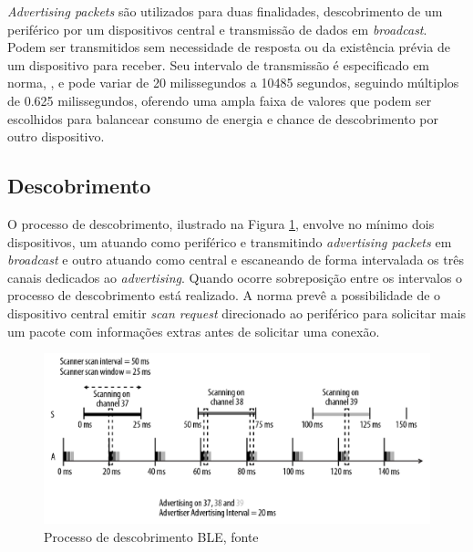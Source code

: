 \documentclass[a5paper]{ufsc-thesis}  %
\begin{document}
 \textit{Advertising packets} são utilizados para duas finalidades, descobrimento de um periférico por um dispositivos central e transmissão de dados em \textit{broadcast}. Podem ser transmitidos sem necessidade de resposta ou da existência prévia de um dispositivo para receber. Seu intervalo de transmissão é especificado em norma, \cite{bt_core}, e pode variar de 20 milissegundos a 10485 segundos, seguindo múltiplos de 0.625 milissegundos, oferendo uma ampla faixa de valores que podem ser escolhidos para balancear consumo de energia e chance de descobrimento por outro dispositivo.

\subsection{Descobrimento}
O processo de descobrimento, ilustrado na Figura \ref{fig:ble_discover}, envolve no mínimo dois dispositivos, um atuando como periférico e transmitindo \textit{advertising packets} em \textit{broadcast} e outro atuando como central e escaneando de forma intervalada os três canais dedicados ao \textit{advertising}. Quando ocorre sobreposição entre os intervalos o processo de descobrimento está realizado. A norma prevê a possibilidade de o dispositivo central emitir \textit{scan request} direcionado ao periférico para solicitar mais um pacote com informações extras antes de solicitar uma conexão.

\begin{figure}[h]
    \centering
    \includegraphics[width=1\linewidth]{imagens/ble_discover.png}
    \caption{Processo de descobrimento BLE, fonte \cite{Townsend_2014}}
    \label{fig:ble_discover}
\end{figure}
\end{document}
